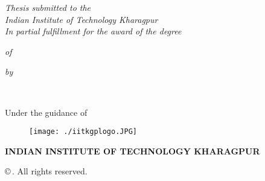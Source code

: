 \thispagestyle{empty}
\begin{center}
    { \large {\bfseries {\mytitle}} \par}
\vspace{3\baselineskip}
    {\textit{Thesis submitted to the} \\ \textit{Indian Institute of Technology Kharagpur} \\ \textit{In partial fulfillment for the award of the degree} \par}
\vspace{\baselineskip}
    {\textit{of} \par}
\vspace{\baselineskip}
    {\large \bf \mydegree \par} 
\vspace{\baselineskip}
    {\textit{by} \par}
\vspace{\baselineskip}
    {{\large {\bf \myname \\ \myrollno}} \par}
\vspace{1.5\baselineskip}
    {Under the guidance of \par}
\vspace{\baselineskip}
    {{\large \bf \mysupervisor} \par}
\vspace{1.5\baselineskip}
    {\begin{figure}[!h] 
	\centering
	\texttt{[image: ./iitkgplogo.JPG]} 
     \end{figure}
    }
    {\bf \MakeUppercase{\mydep} \par}
\vspace*{1ex}
    {\bf \uppercase{Indian Institute of Technology Kharagpur} \par}
    {\Large \mydegreedate \par}
    {\copyright $\,$\myname. All rights reserved.}
  \end{center}

